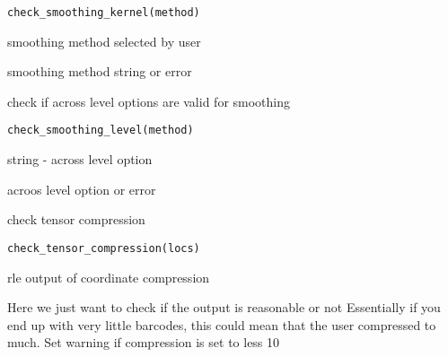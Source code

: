 \documentclass[a4paper]{book}
\begin{document}
%
\begin{Usage}
\begin{verbatim}
check_smoothing_kernel(method)
\end{verbatim}
\end{Usage}
%
\begin{Arguments}
\begin{ldescription}
\item[\code{method}] smoothing method selected by user
\end{ldescription}
\end{Arguments}
%
\begin{Value}
smoothing method string or error
\end{Value}
%
\begin{Description}
check if across level options are valid for smoothing
\end{Description}
%
\begin{Usage}
\begin{verbatim}
check_smoothing_level(method)
\end{verbatim}
\end{Usage}
%
\begin{Arguments}
\begin{ldescription}
\item[\code{method}] string - across level option
\end{ldescription}
\end{Arguments}
%
\begin{Value}
acroos level option or error
\end{Value}
%
\begin{Description}
check tensor compression
\end{Description}
%
\begin{Usage}
\begin{verbatim}
check_tensor_compression(locs)
\end{verbatim}
\end{Usage}
%
\begin{Arguments}
\begin{ldescription}
\item[\code{locs}] rle output of coordinate compression
\end{ldescription}
\end{Arguments}
%
\begin{Details}
Here we just want to check if the output is reasonable or not
Essentially if you end up with very little barcodes, this could mean
that the user compressed to much.
Set warning if compression is set to less 10
\end{Details}
\end{document}
